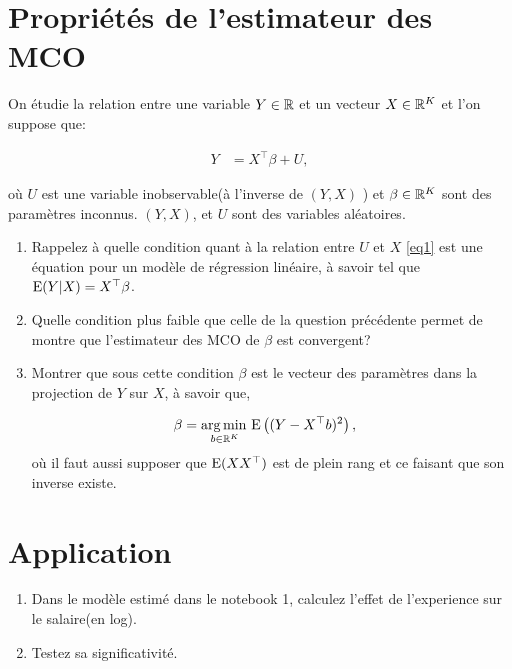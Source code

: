 \newpage

\tableofcontents

\newpage




\section{Propriétés de l'estimateur des MCO}

On étudie la relation entre une variable $Y\in\mathbb{R}$ et un vecteur $X\in\mathbb{R}^K$ et l'on suppose que:

\begin{align}
Y &= X^\top\beta + U,
\label{eq1}
\end{align}

où $U$ est une variable inobservable(à l'inverse de $(Y, X)$ ) et $\beta\in\mathbb{R}^K$ sont des paramètres inconnus. $(Y, X)$, et $U$ sont des 
variables aléatoires.

\begin{enumerate}
    \item Rappelez à quelle condition quant à la relation entre $U$ 
    et $X$ \eqref{eq1} est une équation pour un modèle de régression linéaire, à savoir tel que $\operatorname{E}(Y|X)=X^\top\beta$. 
    \item Quelle condition plus faible que celle de la question précédente permet de montre que l'estimateur des MCO 
    de $\beta$ est convergent? 
    \item Montrer que sous cette condition $\beta$ est le vecteur des paramètres dans la projection de $Y$ sur $X$, à savoir que,
    
    \begin{align}
        \beta &= \argmin_{b\in\R^K}\Exp\left((Y - X^\top b)^2\right),
    \end{align}
    où il faut aussi supposer que $\operatorname{E}(XX^\top)$ est de plein rang et ce faisant que son inverse existe.
\end{enumerate}

\section{Application}

\begin{enumerate}
\item Dans le modèle estimé dans le notebook 1, calculez l'effet de l'experience sur le salaire(en log). 
\item Testez sa significativité.
\end{enumerate}



 
